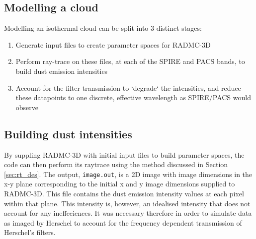 \documentclass{report}
\begin{document}
\subsection{Modelling a cloud}
Modelling an isothermal cloud can be split into 3 distinct stages:

\begin{enumerate}
  \item Generate input files to create parameter spaces for RADMC-3D
  \item Perform ray-trace on these files, at each of the SPIRE and PACS bands, to build dust emission intensities
  \item Account for the filter transmission to `degrade` the intensities, and reduce these datapoints to one discrete, effective wavelength as SPIRE/PACS would observe
\end{enumerate}

\subsection{Building dust intensities}
By suppling RADMC-3D with initial input files to build parameter spaces, the code can then perform its raytrace using the method discussed in Section \ref{sec:rt_des}. The output, \texttt{image.out}, is a 2D image with image dimensions in the x-y plane corresponding to the initial x and y image dimensions supplied to RADMC-3D. This file contains the dust emission intensity values at each pixel within that plane. This intensity is, however, an idealised intensity that does not account for any ineffeciences. It was necessary therefore in order to simulate data as imaged by Herschel to account for the frequency dependent transmission of Herschel's filters.
\end{document}

